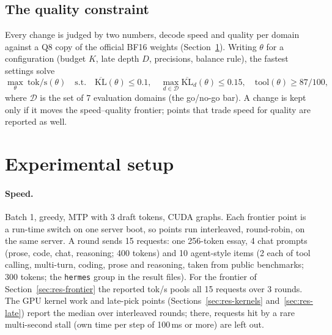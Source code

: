 \documentclass[11pt]{article}
\newcommand{\ms}{\,ms}
\newcommand{\KL}{\mathrm{KL}}
\begin{document}
\subsection{The quality constraint}
\label{sec:constraint}
Every change is judged by two numbers, decode speed and quality per domain against a Q8 copy of the official BF16 weights
(Section~\ref{sec:setup}). Writing $\theta$ for a configuration (budget $K$, late depth $D$, precisions, balance rule),
the fastest settings solve
\begin{equation}
  \max_{\theta}\ \text{tok/s}(\theta) \quad\text{s.t.}\quad
  \overline{\KL}(\theta) \le 0.1,\quad \max_{d\in\mathcal{D}} \overline{\KL}_d(\theta) \le 0.15,\quad
  \text{tool}(\theta) \ge 87/100,
  \label{eq:gonogo}
\end{equation}
where $\mathcal{D}$ is the set of 7 evaluation domains (the go/no-go bar). A change is kept only if it moves the
speed--quality frontier; points that trade speed for quality are reported as well.

\section{Experimental setup}
\label{sec:setup}

\paragraph{Speed.} Batch 1, greedy, MTP with 3 draft tokens, CUDA graphs. Each frontier point is a run-time switch on
one server boot, so points run interleaved, round-robin, on the same server. A round sends 15 requests: one 256-token
essay, 4 chat prompts (prose, code, chat, reasoning; 400 tokens) and 10 agent-style items (2 each of tool calling,
multi-turn, coding, prose and reasoning, taken from public benchmarks; 300 tokens; the \texttt{hermes} group in the
result files). For the frontier of Section~\ref{sec:res-frontier} the reported tok/s pools all 15 requests over 3
rounds. The GPU kernel work and late-pick points (Sections~\ref{sec:res-kernels} and~\ref{sec:res-late}) report the
median over interleaved rounds; there, requests hit by a rare multi-second stall (own time per step of 100\ms{} or more)
are left out.
\end{document}
